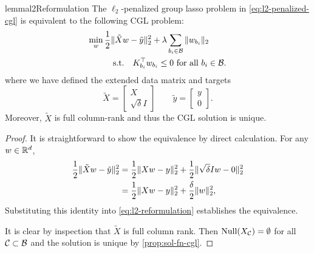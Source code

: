 \begin{restatable}{lemma}{l2Reformulation}\label{lemma:l2-reformulation}
    The \( \ell_2 \)-penalized group lasso problem in \cref{eq:l2-penalized-cgl}
    is equivalent to the following CGL problem:
    \begin{equation}\label{eq:l2-reformulation}
        \begin{aligned}
            \min_{w} \,
             & \frac 1 2 \|\tilde X w - \tilde y\|_2^2 + \lambda \sum_{{b_i} \in \mathcal{B}} \|w_{b_i}\|_2 \\
             & \quad \text{s.t.} \quad K_{{b_i}}^\top w_{b_i} \leq 0  \text{ for all } {b_i} \in \mathcal{B}.
        \end{aligned}
    \end{equation}
    where we have defined the extended data matrix and targets
    \[
        \tilde X =
        \begin{bmatrix}
            X \\
            \sqrt{\delta} I
        \end{bmatrix}
        \quad \quad
        \tilde y =
        \begin{bmatrix}
            y \\
            0
        \end{bmatrix}.
    \]
    Moreover, \( \tilde X \) is full column-rank and thus the CGL solution is
    unique.
\end{restatable}
\begin{proof}
    It is straightforward to show the equivalence by direct calculation.
    For any \( w \in \mathbb{R}^d \),
    \begin{align*}
        \frac 1 2 \|\tilde X w - \tilde y\|_2^2
         & = \frac 1 2 \|X w - y\|_2^2 + \frac 1 2 \|\sqrt{\delta} I w - 0\|_2^2 \\
         & = \frac 1 2 \|X w - y\|_2^2 + \frac{\delta}{2} \|w\|_2^2,
    \end{align*}
    Substituting this identity into \cref{eq:l2-reformulation} establishes the
    equivalence.

    It is clear by inspection that \( \tilde X \) is full column rank.
    Then \( \text{Null}(X_{\mathcal{C}}) = \emptyset \) for all \( \mathcal{C} \subset \mathcal{B} \)
    and the solution is unique by \cref{prop:sol-fn-cgl}.
\end{proof}

